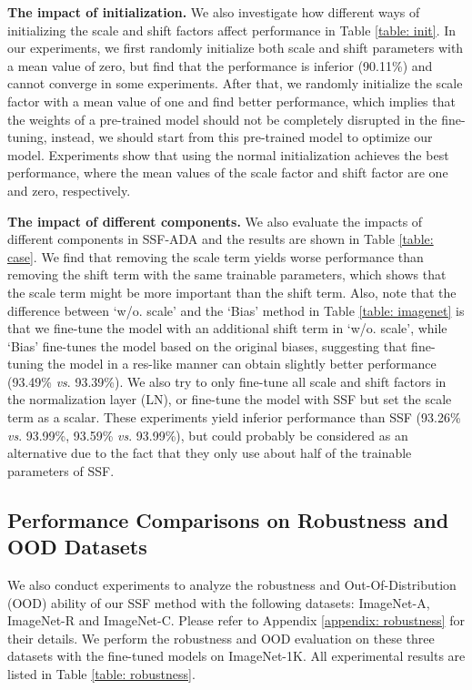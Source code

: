 \textbf{The impact of initialization.} We also investigate how different ways of initializing the scale and shift factors affect performance in Table \ref{table: init}. In our experiments, we first randomly initialize both scale and shift parameters with a mean value of zero, but find that the performance is inferior (90.11\%) and cannot converge in some experiments. After that, we randomly initialize the scale factor with a mean value of one and find better performance, which implies that the weights of a pre-trained model should not be completely disrupted in the fine-tuning, instead, we should start from this pre-trained model to optimize our model. Experiments show that using the normal initialization achieves the best performance, where the mean values of the scale factor and shift factor are one and zero, respectively.

\textbf{The impact of different components.} We also evaluate the impacts of different components in SSF-ADA and the results are shown in Table \ref{table: case}. We find that removing the scale term yields worse performance than removing the shift term with the same trainable parameters, which shows that the scale term might be more important than the shift term. Also, note that the difference between `w/o. scale' and the `Bias' method in Table \ref{table: imagenet} is that we fine-tune the model with an additional shift term in `w/o. scale', while `Bias' fine-tunes the model based on the original biases, suggesting that fine-tuning the model in a res-like manner can obtain slightly better performance (93.49\% \emph{vs}. 93.39\%). We also try to only fine-tune all scale and shift factors in the normalization layer (LN), or fine-tune the model with SSF but set the scale term as a scalar. These experiments yield inferior performance than SSF (93.26\% \emph{vs}. 93.99\%, 93.59\% \emph{vs}. 93.99\%), but could probably be considered as an alternative due to the fact that they only use about half of the trainable parameters of SSF. 

\subsection{Performance Comparisons on Robustness and OOD Datasets}\label{sec: 4.4}

We also conduct experiments to analyze the robustness and Out-Of-Distribution (OOD) ability of our SSF method with the following datasets: ImageNet-A, ImageNet-R and ImageNet-C. Please refer to Appendix \ref{appendix: robustness} for their details. We perform the robustness and OOD evaluation on these three datasets with the fine-tuned models on ImageNet-1K. All experimental results are listed in Table \ref{table: robustness}.  

